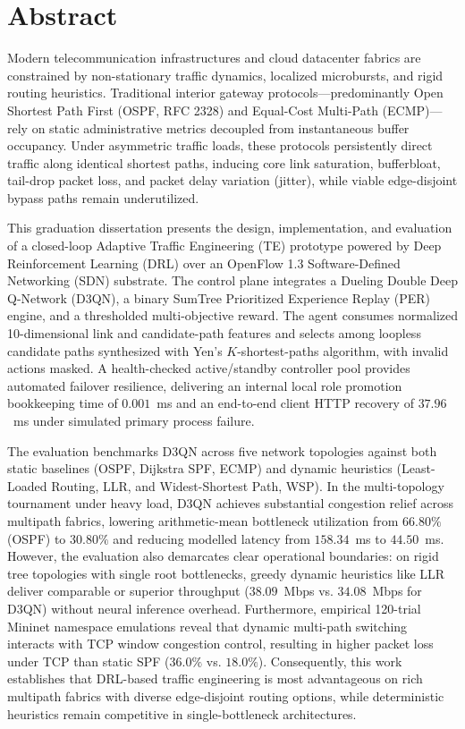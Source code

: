 \documentclass[12pt,a4paper,oneside]{report}
\begin{document}
\clearpage

\chapter*{Abstract}

Modern telecommunication infrastructures and cloud datacenter fabrics are constrained by non-stationary traffic dynamics, localized microbursts, and rigid routing heuristics. Traditional interior gateway protocols---predominantly Open Shortest Path First (OSPF, RFC 2328) and Equal-Cost Multi-Path (ECMP)---rely on static administrative metrics decoupled from instantaneous buffer occupancy. Under asymmetric traffic loads, these protocols persistently direct traffic along identical shortest paths, inducing core link saturation, bufferbloat, tail-drop packet loss, and packet delay variation (jitter), while viable edge-disjoint bypass paths remain underutilized.

This graduation dissertation presents the design, implementation, and evaluation of a closed-loop Adaptive Traffic Engineering (TE) prototype powered by Deep Reinforcement Learning (DRL) over an OpenFlow 1.3 Software-Defined Networking (SDN) substrate. The control plane integrates a Dueling Double Deep Q-Network (D3QN), a binary SumTree Prioritized Experience Replay (PER) engine, and a thresholded multi-objective reward. The agent consumes normalized 10-dimensional link and candidate-path features and selects among loopless candidate paths synthesized with Yen's $K$-shortest-paths algorithm, with invalid actions masked. A health-checked active/standby controller pool provides automated failover resilience, delivering an internal local role promotion bookkeeping time of $0.001$~ms and an end-to-end client HTTP recovery of $37.96$~ms under simulated primary process failure.

The evaluation benchmarks D3QN across five network topologies against both static baselines (OSPF, Dijkstra SPF, ECMP) and dynamic heuristics (Least-Loaded Routing, LLR, and Widest-Shortest Path, WSP). In the multi-topology tournament under heavy load, D3QN achieves substantial congestion relief across multipath fabrics, lowering arithmetic-mean bottleneck utilization from $66.80\%$ (OSPF) to $30.80\%$ and reducing modelled latency from $158.34$~ms to $44.50$~ms. However, the evaluation also demarcates clear operational boundaries: on rigid tree topologies with single root bottlenecks, greedy dynamic heuristics like LLR deliver comparable or superior throughput ($38.09$~Mbps vs. $34.08$~Mbps for D3QN) without neural inference overhead. Furthermore, empirical 120-trial Mininet namespace emulations reveal that dynamic multi-path switching interacts with TCP window congestion control, resulting in higher packet loss under TCP than static SPF ($36.0\%$ vs. $18.0\%$). Consequently, this work establishes that DRL-based traffic engineering is most advantageous on rich multipath fabrics with diverse edge-disjoint routing options, while deterministic heuristics remain competitive in single-bottleneck architectures.
\end{document}
